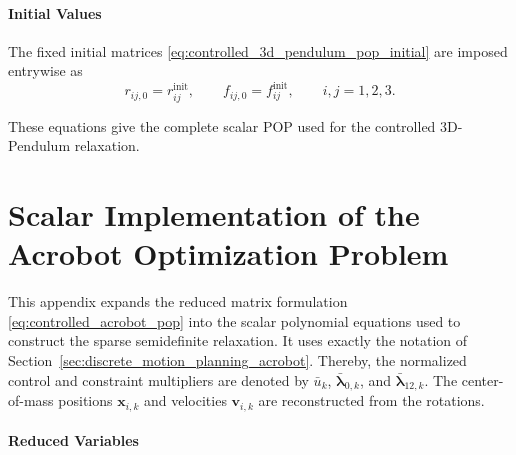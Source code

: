 \paragraph{Initial Values}

The fixed initial matrices \eqref{eq:controlled_3d_pendulum_pop_initial} are imposed entrywise as
\begin{equation}
r_{ij,0}=r_{ij}^{\mathrm{init}},
\qquad
f_{ij,0}=f_{ij}^{\mathrm{init}},
\qquad i,j=1,2,3.
\label{eq:app_3d_scalar_initial_values}
\end{equation}

These equations give the complete
scalar POP used for the controlled 3D-Pendulum relaxation.

\section{Scalar Implementation of the Acrobot Optimization Problem}
\label{app:controlled_acrobot_scalar_pop}

This appendix expands the reduced matrix formulation
\eqref{eq:controlled_acrobot_pop} into the scalar polynomial equations used to
construct the sparse semidefinite relaxation. It uses exactly the notation of
Section~\ref{sec:discrete_motion_planning_acrobot}. Thereby, the normalized control and
constraint multipliers are denoted by \(\bar u_k\), \(\bar{\bm{\lambda}}_{0,k}\), and
\(\bar{\bm{\lambda}}_{12,k}\). The center-of-mass positions \(\bm{x}_{i,k}\) and
velocities \(\bm{v}_{i,k}\) are reconstructed from the rotations.

\paragraph{Reduced Variables}

